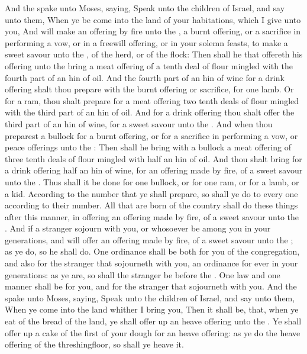 \begin{biblechapter} %
 And the \LORD spake unto Moses, saying,
\verse Speak unto the children of Israel, and say unto them, When ye be come into the land of your habitations, which I give unto you,
\verse And will make an offering by fire unto the \LORD, a burnt offering, or a sacrifice in performing a vow, or in a freewill offering, or in your solemn feasts, to make a sweet savour unto the \LORD, of the herd, or of the flock:
\verse Then shall he that offereth his offering unto the \LORD bring a meat offering of a tenth deal of flour mingled with the fourth part of an hin of oil.
\verse And the fourth part of an hin of wine for a drink offering shalt thou prepare with the burnt offering or sacrifice, for one lamb.
\verse Or for a ram, thou shalt prepare for a meat offering two tenth deals of flour mingled with the third part of an hin of oil.
\verse And for a drink offering thou shalt offer the third part of an hin of wine, for a sweet savour unto the \LORD.
\verse And when thou preparest a bullock for a burnt offering, or for a sacrifice in performing a vow, or peace offerings unto the \LORD:
\verse Then shall he bring with a bullock a meat offering of three tenth deals of flour mingled with half an hin of oil.
\verse And thou shalt bring for a drink offering half an hin of wine, for an offering made by fire, of a sweet savour unto the \LORD.
\verse Thus shall it be done for one bullock, or for one ram, or for a lamb, or a kid.
\verse According to the number that ye shall prepare, so shall ye do to every one according to their number.
\verse All that are born of the country shall do these things after this manner, in offering an offering made by fire, of a sweet savour unto the \LORD.
\verse And if a stranger sojourn with you, or whosoever be among you in your generations, and will offer an offering made by fire, of a sweet savour unto the \LORD; as ye do, so he shall do.
\verse One ordinance shall be both for you of the congregation, and also for the stranger that sojourneth with you, an ordinance for ever in your generations: as ye are, so shall the stranger be before the \LORD.
\verse One law and one manner shall be for you, and for the stranger that sojourneth with you.
\verse And the \LORD spake unto Moses, saying,
\verse Speak unto the children of Israel, and say unto them, When ye come into the land whither I bring you,
\verse Then it shall be, that, when ye eat of the bread of the land, ye shall offer up an heave offering unto the \LORD.
\verse Ye shall offer up a cake of the first of your dough for an heave offering: as ye do the heave offering of the threshingfloor, so shall ye heave it.

\end{biblechapter}
